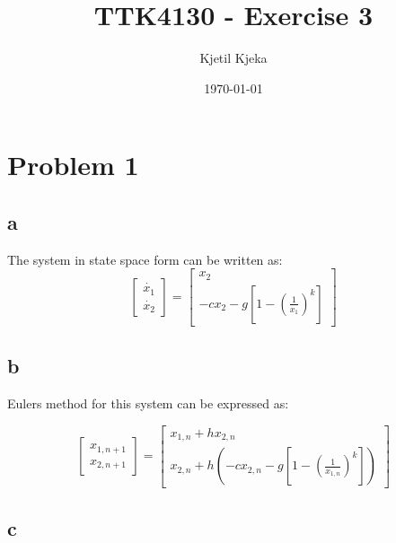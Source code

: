 \documentclass[11pt]{article}
\author{Kjetil Kjeka}
\title{TTK4130 - Exercise 3}
\date{\today}
\begin{document}
\maketitle
\section*{Problem 1}
\subsection*{a}
The system in state space form can be written as:
\[
\begin{bmatrix}
\dot{x_1} \\
\dot{x_2}
\end{bmatrix}
=
\begin{bmatrix}
x_2 \\
-c x_2 - g [1 - (\frac{1}{x_1})^k]
\end{bmatrix}
\]
\subsection*{b}
Eulers method for this system can be expressed as:

\[
\begin{bmatrix}
x_{1,n+1} \\
x_{2,n+1}  
\end{bmatrix}
=
\begin{bmatrix}
x_{1,n} + hx_{2,n} \\
x_{2,n} + h(-cx_{2,n} - g[1-(\frac{1}{x_{1,n}})^k])
\end{bmatrix}
\]

\subsection*{c}
\end{document}
